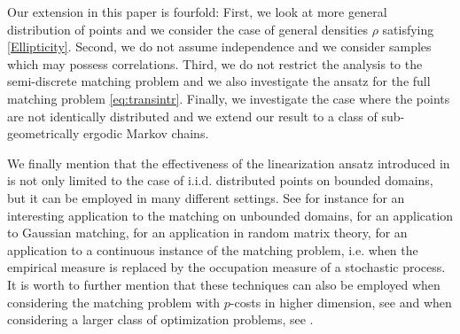 \documentclass[11pt,a4paper,oneside]{amsart}
\numberwithin{equation}{section}
\begin{document}
%
\medskip
%

Our extension in this paper is fourfold: First, we look at more general distribution of points and we consider the case of general densities $\rho$ satisfying \eqref{Ellipticity}. Second, we do not assume independence and we consider samples which may possess correlations. Third, we do not restrict the analysis to the semi-discrete matching problem and we also investigate the ansatz for the full matching problem \eqref{eq:transintr}. %
Finally, we investigate the case where the points are not identically distributed and we extend our result to a class of sub-geometrically ergodic Markov chains.

%
\medskip
%

We finally mention that the effectiveness of the linearization ansatz introduced in \cite{caracciolo2014scaling} is not only limited to the case of i.i.d. distributed points on bounded domains, but it can be employed in many different settings. See for instance \cite{CagliotiPieroni} for an interesting application to the matching on unbounded domains, \cite{Ledoux, Ledoux2, Ledoux3} for an application to Gaussian matching, \cite{Jonas} for an application in random matrix theory, \cite{Wang2, Wang3, Wang, HMTfBm} for an application to a continuous instance of the matching problem, i.e. when the empirical measure is replaced by the occupation measure of a stochastic process. It is worth to further mention that these techniques can also be employed when considering the matching problem with $p$-costs in higher dimension, see \cite{GoldTrev} and when considering a larger class of optimization problems, see \cite{GoldTrevOpt}.
\end{document}
